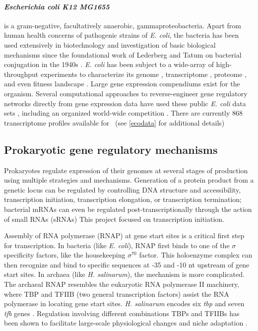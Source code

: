 \paragraph{\textit{Escherichia coli K12 MG1655}} is a gram-negative, facultatively anaerobic, gammaproteobacteria. Apart from human health concerns of pathogenic strains of \textit{E. coli}, the bacteria has been used extensively in biotechnology and investigation of basic biological mechanisms since the foundational work of Lederberg and Tatum on bacterial conjugation in the 1940s \cite{tatum_gene_1947}. \textit{E. coli} has been subject to a wide-array of high-throughput experiments to characterize its genome \cite{blattner_complete_1997}, transcriptome \cite{tjaden_transcriptome_2002}, proteome \cite{taniguchi_quantifying_2010}, and even fitness landscape \cite{nichols_phenotypic_2011}. Large gene expression compendiums exist for the organism. Several computational approaches to reverse-engineer gene regulatory networks directly from gene expression data have used these public \textit{E. coli} data sets \cite{lemmens_distiller:_2009,michoel_comparative_2009,de_smet_ensemble_2011,mordelet_sirene:_2008}, including an organized world-wide competition \cite{marbach_wisdom_2012}. There are currently 868 transcriptome profiles available for \eco\ (see \ref{ecodata} for additional details)

\subsection{Prokaryotic gene regulatory mechanisms}

Prokaryotes regulate expression of their genomes at several stages of production using multiple strategies and mechanisms. Generation of a protein product from a genetic locus can be regulated by controlling DNA structure and accessibility, transcription initiation, transcription elongation, or transcription termination; bacterial mRNAs can even be regulated post-transcriptionally through the action of small RNAs (sRNAs) This project focused on transcription initiation. 

Assembly of RNA polymerase (RNAP) at gene start sites is a critical first step for transcription. In bacteria (like \textit{E. coli}), RNAP first binds to one of the $\sigma$ specificity factors, like the housekeeping $\sigma^{70}$ factor. This holoenzyme complex can then recognize and bind to specific sequences at -35 and -10 nt upstream of gene start sites. In archaea (like \textit{H. salinarum}), the mechanism is more complicated. The archaeal RNAP resembles the eukaryotic RNA polymerase II machinery, where TBP and TFIIB (two general transcription factors) assist the RNA polymerase in locating gene start sites. \textit{H. salinarum} encodes six \textit{tbp} and seven \textit{tfb} genes \cite{baliga_is_2000}. Regulation involving different combinations TBPs and TFIIBs has been shown to facilitate large-scale physiological changes \cite{facciotti_general_2007} and niche adaptation \cite{turkarslan_niche_2011}. 

